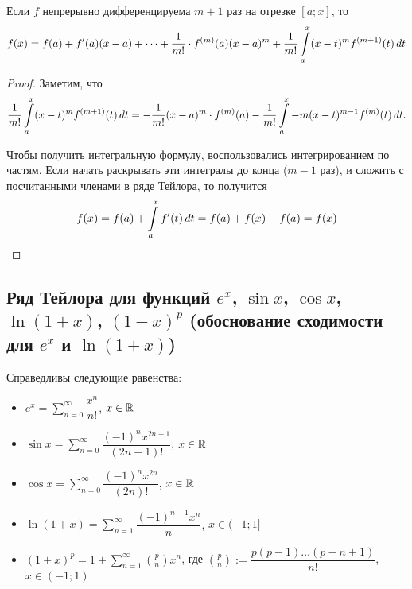 \documentclass[a4paper]{article}
\theoremstyle{named}
\renewcommand{\int}{\intop}
\begin{document}
    	\begin{theorem*}
    		Если $f$ непрерывно дифференцируема $m + 1$ раз на отрезке $[a; x]$, то
    		\begin{equation*}
    			f(x) = f(a) + f'(a)(x - a) + \dots + \dfrac{1}{m!} \cdot f^{(m)}(a) (x-  a)^m + \dfrac{1}{m!} \int_a^x (x - t)^m f^{(m + 1)}(t) \dd t
    		\end{equation*}
    	\end{theorem*}

    	\begin{proof}
    		Заметим, что
    		\begin{equation*}
    			\dfrac{1}{m!} \int_a^x (x - t)^m f^{(m + 1)}(t) \dd t
    			= -\dfrac{1}{m!}(x - a)^m \cdot f^{(m)}(a) - \dfrac{1}{m!} \int_a^x -m(x - t)^{m - 1}f^{(m)}(t) \dd t.
    		\end{equation*}

    		Чтобы получить интегральную формулу, воспользовались интегрированием по частям. Если начать раскрывать эти интегралы до конца ($m - 1$ раз), и сложить с посчитанными членами в ряде Тейлора, то получится
    		\begin{equation*}
    			f(x) = f(a) + \int_a^x f'(t) \dd t = f(a) + f(x) - f(a) = f(x)
    		\end{equation*}
    	\end{proof}

    	\subsection{Ряд Тейлора для функций $e^x$, $\sin x$, $\cos x$, $\ln(1 + x)$, $(1 + x)^p$ (обоснование сходимости для $e^x$ и $\ln(1 + x)$)}

    	\begin{consequence*}
    		Справедливы следующие равенства:

    		\begin{itemize}
    		\item
    			$e^x = \sum_{n = 0}^{\infty} \dfrac{x^n}{n!}$, $x \in \mathbb{R}$

    		\item
    			$\sin x = \sum_{n = 0}^{\infty} \dfrac{(-1)^n x^{2n + 1}}{(2n + 1)!}$, $x \in \mathbb{R}$

    		\item
    			$\cos x = \sum_{n = 0}^{\infty} \dfrac{(-1)^n x^{2n}}{(2n)!}$, $x \in \mathbb{R}$

    		\item
    			$\ln(1 + x) = \sum_{n = 1}^{\infty} \dfrac{(-1)^{n - 1}x^n}{n}$, $x \in (-1; 1]$

    		\item
    			$(1 + x)^p = 1 + \sum_{n = 1}^{\infty} \binom{p}{n} x^n$, где $\binom{p}{n} := \dfrac{p(p - 1) \dots (p - n + 1)}{n!}$, $x \in (-1; 1)$
    		\end{itemize}
    	\end{consequence*}
\end{document}
